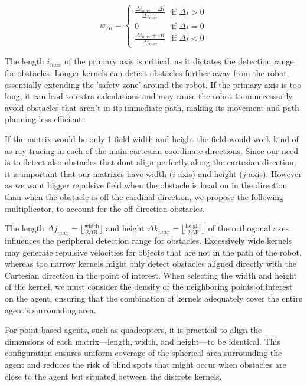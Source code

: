 \documentclass[letterpaper, 10 pt, conference]{ieeeconf}  %
\begin{document}
\begin{equation}
	w_{\Delta i} = 
	\begin{cases} 
	 	\frac{\Delta i_{max} - \Delta i}{\Delta i_{max}} & \text{if } \Delta i > 0 \\
		0 & \text{if } \Delta i = 0 \\
		\frac{\Delta i_{max} + \Delta i}{\Delta i_{max}}& \text{if } \Delta i < 0 
	\end{cases}
\end{equation}

The length $i_{max}$ of the primary axis is critical, as it dictates the detection range for obstacles. Longer kernels can detect obstacles further away from the robot, essentially extending the ’safety zone’ around the robot. If the primary axis is too long, it can lead to extra calculations and may cause the robot to unnecessarily avoid obstacles that aren't in its immediate path, making its movement and path planning less efficient. 

If the matrix would be only 1 field width and height the field would work kind of as ray tracing in each of the main cartesian coordinate directions. Since our need is to detect also obstacles that dont align perfectly along the cartesian direction, it is important that our matrixes have width ($i$ axis) and height ($j$ axis). However as we want bigger repulsive field when the obstacle is head on in the direction than when the obstacle is off the cardinal direction, we propose the following multiplicator, to account for the off direction obstacles.

The length $\Delta j_{max} = \lfloor \frac{\mathrm{width}}{2 \Delta \mathrm{R}} \rfloor$ and height $\Delta k_{max} = \lfloor \frac{\mathrm{height}}{2 \Delta \mathrm{R}} \rfloor$ of the orthogonal axes influences the peripheral detection range for obstacles. Excessively wide kernels may generate repulsive velocities for objects that are not in the path of the robot, whereas too narrow kernels might only detect obstacles aligned directly with the Cartesian direction in the point of interest. When selecting the width and height of the kernel, we must consider the density of the neighboring points of interest on the agent, ensuring that the combination of kernels adequately cover the entire agent's surrounding area. 

For point-based agents, such as quadcopters, it is practical to align the dimensions of each matrix—length, width, and height—to be identical. This configuration ensures uniform coverage of the spherical area surrounding the agent and reduces the risk of blind spots that might occur when obstacles are close to the agent but situated between the discrete kernels.
\end{document}
